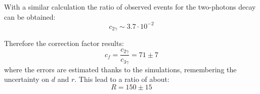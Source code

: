 \documentclass[main.tex]{subfiles}
\begin{document}
With a similar calculation the ratio of observed events for the two-photons decay can be obtained:
\begin{equation*}
  c_{2\gamma} \sim 3.7\cdot10^{-2}
\end{equation*}

Therefore the correction factor results:
\begin{equation}
  c_f = \frac{c_{2\gamma}}{c_{3\gamma}} = 71\pm7
\end{equation}
where the errors are estimated thanks to the simulations, remembering the uncertainty on $d$ and $r$.
This lead to a ratio of about:
\begin{equation}
  R = 150 \pm 15
\end{equation}


\end{document}
